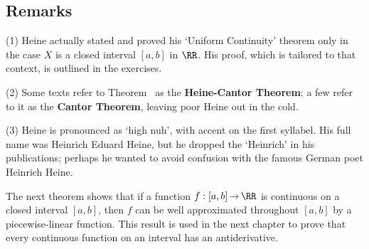 {\V
\V

             \subsection{\small{\bf Remarks}}
            \label{RemrkD60.50}

\V

\hspace*{\parindent}(1) Heine actually stated and proved his `Uniform Continuity' theorem only in the case $X$ is a closed interval $[a,b]$ in ${\RR}$.
    His proof, which is tailored to that context, is outlined in the exercises.

\V

        (2) Some texts refer to Theorem~ as the {\bf Heine-Cantor Theorem};
    a few refer to it as the {\bf Cantor Theorem}, leaving poor Heine out in the cold.

\V

        (3) Heine is pronounced as `high nuh', with accent on the first syllabel.
    His full name was Heinrich Eduard Heine, but he dropped the `Heinrich' in his publications;
    perhaps he wanted to avoid confusion with the famous German poet Heinrich Heine.


\V
\V

        The next theorem shows that if a function $f:[a,b] \,{\rightarrow}\, {\RR}$ is continuous on a closed interval $[a,b]$,
    then $f$ can be well approximated throughout $[a,b]$ by a piecewise-linear function.
    This result is used in the next chapter to prove that every continuous function on an interval has an antiderivative.


}%


